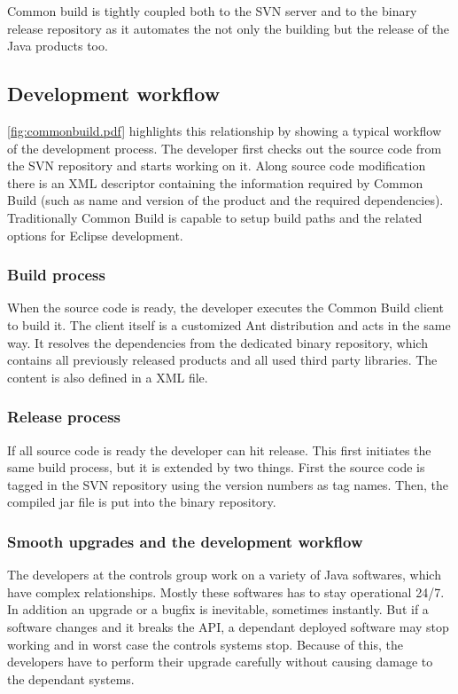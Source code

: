 Common build is tightly coupled both to the SVN server and to the binary release
repository as it automates the not only the building but the release of the
Java products too.

\subsection{Development workflow}
\autoref{fig:commonbuild.pdf} highlights this relationship by showing a typical
workflow of the development process. The developer first checks out the source
code from the SVN repository and starts working on it. Along source code
modification there is an XML descriptor containing the information required by
Common Build (such as name and version of the product and the required
dependencies). Traditionally Common Build is capable to setup build paths and the related
options for Eclipse development. 

\subsubsection{Build process}
When the source code is ready, the developer executes the Common Build client to
build it. The client itself is a customized Ant distribution and acts in the
same way. It resolves the dependencies from the dedicated binary repository,
which contains all previously released products and all used third party
libraries. The content is also defined in a XML file.

\subsubsection{Release process}
If all source code is ready the developer can hit release. This first initiates
the same build process, but it is extended by two things. First the source code
is tagged in the SVN repository using the version numbers as tag names. Then, the
compiled jar file is put into the binary repository. 

\subsubsection{Smooth upgrades and the development workflow}
The developers at the controls group work on a variety of Java softwares, which
have complex relationships. Mostly these softwares has to stay operational 24/7.
In addition an upgrade or a bugfix is inevitable, sometimes instantly. But if a
software changes and it breaks the API, a dependant deployed software may stop
working and in worst case the controls systems stop. Because of this, the
developers have to perform their upgrade carefully without causing damage to the
dependant systems.

